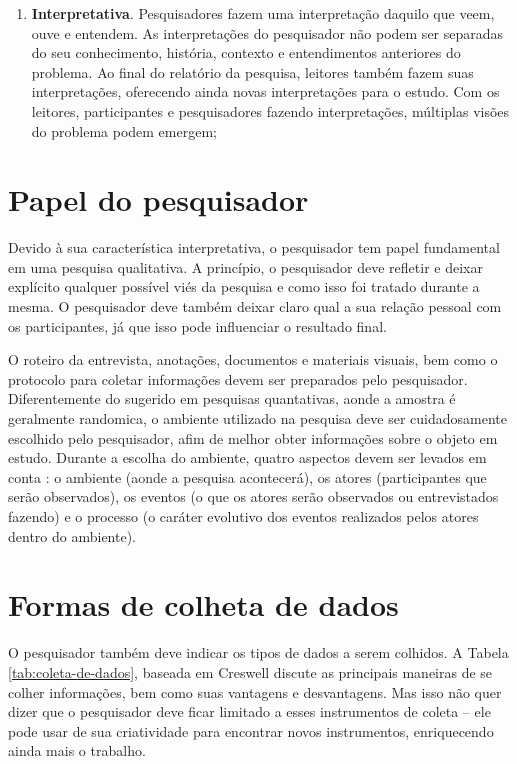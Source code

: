 \begin{enumerate}
  \item \textbf{Interpretativa}. Pesquisadores fazem uma interpretação daquilo
  que veem, ouve e entendem. As interpretações do pesquisador não podem ser
  separadas do seu conhecimento, história, contexto e entendimentos anteriores
  do problema. Ao final do relatório da pesquisa, leitores também fazem suas
  interpretações, oferecendo ainda novas interpretações para o estudo. Com os
  leitores, participantes e pesquisadores fazendo interpretações, múltiplas
  visões do problema podem emergem;
  
\end{enumerate} 

\section{Papel do pesquisador}

Devido à sua característica interpretativa, o pesquisador tem papel fundamental
em uma pesquisa qualitativa. A princípio, o pesquisador deve refletir e
deixar explícito qualquer possível viés da pesquisa e como isso foi tratado
durante a mesma. O pesquisador deve também deixar claro qual a sua relação
pessoal com os participantes, já que isso pode influenciar o resultado final.

O roteiro da entrevista, anotações, documentos e materiais visuais, bem como o
protocolo para coletar informações devem ser preparados pelo pesquisador.
Diferentemente do sugerido em pesquisas quantativas, aonde a amostra é
geralmente randomica, o ambiente utilizado na pesquisa deve ser cuidadosamente
escolhido pelo pesquisador, afim de melhor obter informações sobre o objeto em
estudo. Durante a escolha do ambiente, quatro aspectos devem ser levados em
conta \cite{miles-and-huberman}: o ambiente (aonde a pesquisa acontecerá), os
atores (participantes que serão observados), os eventos (o que os atores serão
observados ou entrevistados fazendo) e o processo (o caráter evolutivo dos
eventos realizados pelos atores dentro do ambiente).

\section{Formas de colheta de dados}

O pesquisador também deve indicar os tipos de dados a serem colhidos. A Tabela
\ref{tab:coleta-de-dados}, baseada em Creswell \cite{creswell} discute as
principais maneiras de se colher informações, bem como suas vantagens e
desvantagens. Mas isso não quer dizer que o pesquisador deve ficar limitado a
esses instrumentos de coleta -- ele pode usar de sua criatividade para encontrar
novos instrumentos, enriquecendo ainda mais o trabalho.

